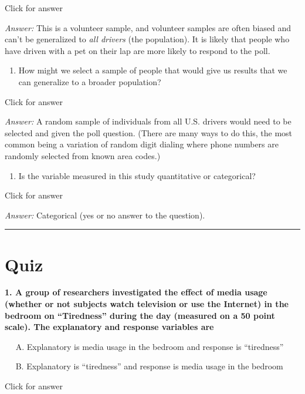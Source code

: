 \documentclass[
]{book}
\providecommand{\tightlist}{%
  \setlength{\itemsep}{0pt}\setlength{\parskip}{0pt}}
\begin{document}
Click for answer

\emph{Answer:} This is a volunteer sample, and volunteer samples are often biased and can't be generalized to \emph{all drivers} (the population). It is likely that people who have driven with a pet on their lap are more likely to respond to the poll.

\begin{enumerate}
\def\labelenumi{\alph{enumi}.}
\setcounter{enumi}{2}
\tightlist
\item
  How might we select a sample of people that would give us results that we can generalize to a broader population?
\end{enumerate}

Click for answer

\emph{Answer:} A random sample of individuals from all U.S. drivers would need to be selected and given the poll question. (There are many ways to do this, the most common being a variation of random digit dialing where phone numbers are randomly selected from known area codes.)

\begin{enumerate}
\def\labelenumi{\alph{enumi}.}
\setcounter{enumi}{3}
\tightlist
\item
  Is the variable measured in this study quantitative or categorical?
\end{enumerate}

Click for answer

\emph{Answer:} Categorical (yes or no answer to the question).

\begin{center}\rule{0.5\linewidth}{0.5pt}\end{center}

\hypertarget{quiz-1}{%
\section{Quiz}\label{quiz-1}}

\textbf{1. A group of researchers investigated the effect of media usage (whether or not subjects watch television or use the Internet) in the bedroom on ``Tiredness'' during the day (measured on a 50 point scale). The explanatory and response variables are}

  A. Explanatory is media usage in the bedroom and response is ``tiredness''

  B. Explanatory is ``tiredness'' and response is media usage in the bedroom

Click for answer
\end{document}
